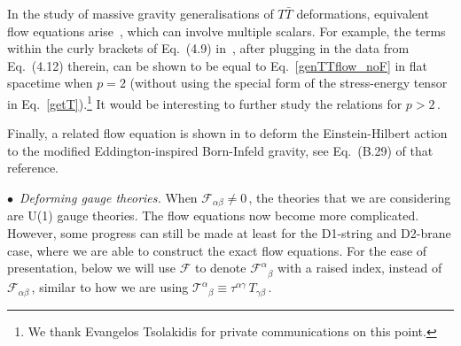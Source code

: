 \documentclass[11pt]{article}
\newcommand{\CF}{\mathcal{F}}
\newcommand{\CT}{\mathcal{T}}
\renewcommand{\emph}[1]{\textit{#1}}
\begin{document}
In the study of massive gravity generalisations of $T\bar{T}$ deformations, equivalent flow equations arise~\cite{Tsolakidis:2024wut}, which can involve multiple scalars. For example, the terms within the curly brackets of Eq.~(4.9) in~\cite{Tsolakidis:2024wut}, after plugging in the data from Eq.~(4.12) therein, can be shown to be equal to Eq.~\eqref{genTTflow_noF} in flat spacetime when $p=2$ (without using the special form of the stress-energy tensor in Eq.~\eqref{getT}).\footnote{We thank Evangelos Tsolakidis for private communications on this point.} It would be interesting to further study the relations for $p > 2$\,.

Finally, a related flow equation is shown in \cite{Morone:2024ffm} to deform the Einstein-Hilbert action to the modified Eddington-inspired Born-Infeld gravity, see Eq.~(B.29) of that reference. 



\vspace{3mm}

\noindent $\bullet$~\emph{Deforming gauge theories.}
When $\CF_{\alpha\beta} \neq 0$\,, the theories that we are considering are U(1) gauge theories. The flow equations now become more complicated. However, some progress can still be made at least for the D1-string and D2-brane case, where we are able to construct the exact flow equations. For the ease of presentation, below we will use $\CF$ to denote $\CF^\alpha{}^{}_\beta$ with a raised index, instead of $\CF_{\alpha\beta}$\,, similar to how we are using $\CT^\alpha{}_\beta \equiv \tau^{\alpha\gamma} \, T_{\gamma\beta}$\,.   
\end{document}
